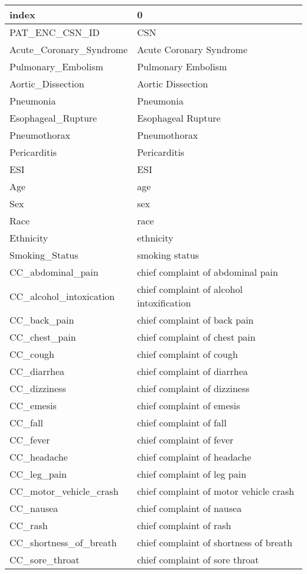 \begin{tabular}{ll}
\toprule
index & 0 \\
\midrule
PAT\_ENC\_CSN\_ID & CSN \\
Acute\_Coronary\_Syndrome & Acute Coronary Syndrome \\
Pulmonary\_Embolism & Pulmonary Embolism \\
Aortic\_Dissection & Aortic Dissection \\
Pneumonia & Pneumonia \\
Esophageal\_Rupture & Esophageal Rupture \\
Pneumothorax & Pneumothorax \\
Pericarditis & Pericarditis \\
ESI & ESI \\
Age & age \\
Sex & sex \\
Race & race \\
Ethnicity & ethnicity \\
Smoking\_Status & smoking status \\
CC\_abdominal\_pain & chief complaint of abdominal pain \\
CC\_alcohol\_intoxication & chief complaint of  alcohol intoxification \\
CC\_back\_pain & chief complaint of back pain \\
CC\_chest\_pain & chief complaint of chest pain \\
CC\_cough & chief complaint of cough \\
CC\_diarrhea & chief complaint of diarrhea \\
CC\_dizziness & chief complaint of dizziness \\
CC\_emesis & chief complaint of emesis \\
CC\_fall & chief complaint of fall \\
CC\_fever & chief complaint of fever \\
CC\_headache & chief complaint of headache \\
CC\_leg\_pain & chief complaint of leg pain \\
CC\_motor\_vehicle\_crash & chief complaint of motor vehicle crash \\
CC\_nausea & chief complaint of nausea \\
CC\_rash & chief complaint of rash \\
CC\_shortness\_of\_breath & chief complaint of shortness of breath \\
CC\_sore\_throat & chief complaint of sore throat \\

\end{tabular}
